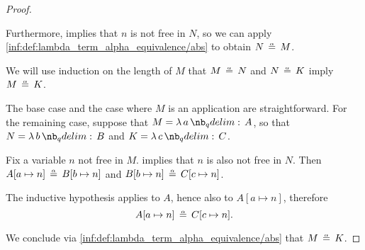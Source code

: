 \begin{proof}
\begin{itemize}
    Furthermore,  implies that \( n \) is not free in \( N \), so we can apply \ref{inf:def:lambda_term_alpha_equivalence/abs} to obtain \( N \aequiv M \).
  \end{itemize}

   We will use induction on the length of \( M \) that \( M \aequiv N \) and \( N \aequiv K \) imply \( M \aequiv K \).

  The base case and the case where \( M \) is an application are straightforward. For the remaining case, suppose that \( M = \qabs a A \), so that \( N = \qabs b B \) and \( K = \qabs c C \).

  Fix a variable \( n \) not free in \( M \).  implies that \( n \) is also not free in \( N \). Then \( A[a \mapsto n] \aequiv B[b \mapsto n] \) and \( B[b \mapsto n] \aequiv C[c \mapsto n] \).

  The inductive hypothesis applies to \( A \), hence also to \( A[a \mapsto n] \), therefore
  \begin{equation*}
    A[a \mapsto n] \aequiv C[c \mapsto n].
  \end{equation*}

  We conclude via \ref{inf:def:lambda_term_alpha_equivalence/abs} that \( M \aequiv K \).
\end{proof}

